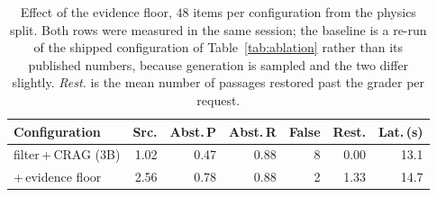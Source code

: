 \begin{table}[htbp]
\caption{Effect of the evidence floor, $48$ items per configuration from the
physics split. Both rows were measured in the same session; the baseline is
a re-run of the shipped configuration of Table~\ref{tab:ablation} rather than
its published numbers, because generation is sampled and the two differ
slightly. \emph{Rest.} is the mean number of passages restored past the
grader per request.}
\label{tab:floor}
\centering
\begin{tabular}{lrrrrrr}
\toprule
\textbf{Configuration} & \textbf{Src.} & \textbf{Abst.\,P} & \textbf{Abst.\,R} & \textbf{False} & \textbf{Rest.} & \textbf{Lat.\,(s)} \\
\midrule
filter\,+\,CRAG ($3$B) & 1.02 & 0.47 & 0.88 & 8 & 0.00 & 13.1 \\
\quad +\,evidence floor & 2.56 & 0.78 & 0.88 & 2 & 1.33 & 14.7 \\
\bottomrule
\end{tabular}
\end{table}
